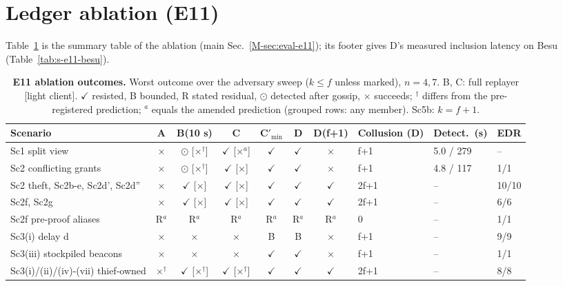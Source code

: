 \documentclass[10pt]{article}
\newcommand{\mainref}[1]{\ref{M-#1}}
\begin{document}
\section{Ledger ablation (E11)}
\label{sec:e11}
Table~\ref{tab:ablation} is the summary table of the ablation (main Sec.~\mainref{sec:eval-e11}); its footer gives D's
measured inclusion latency on Besu (Table~\ref{tab:s-e11-besu}).
\begin{table}[!htbp]
\centering
\caption{\textbf{E11 ablation outcomes.} Worst outcome over the adversary sweep ($k \le f$ unless marked), $n = 4, 7$. B, C: full replayer [light client]. $\checkmark$ resisted, B bounded, R stated residual, $\odot$ detected after gossip, $\times$ succeeds; $^{\dagger}$ differs from the pre-registered prediction; $^{a}$ equals the amended prediction (grouped rows: any member). Sc5b: $k = f+1$.}
\label{tab:ablation}
\tabsmall
\setlength{\tabcolsep}{3.6pt}
\begin{tabular}{@{}lcccccclll@{}}
\toprule
Scenario & A & B(10 s) & C & C$'_{\min}$ & D & D(f+1) & Collusion (D) & Detect.\ (s) & EDR \\
\midrule
Sc1 split view & $\times$ & $\odot$ [$\times$$^{\dagger}$] & $\checkmark$ [$\times$$^{a}$] & $\checkmark$ & $\checkmark$ & $\times$ & f+1 & 5.0 / 279 & -- \\
Sc2 conflicting grants & $\times$ & $\odot$ [$\times$$^{\dagger}$] & $\checkmark$ [$\times$] & $\checkmark$ & $\checkmark$ & $\times$ & f+1 & 4.8 / 117 & 1/1 \\
Sc2 theft, Sc2b-e, Sc2d', Sc2d'' & $\times$ & $\checkmark$ [$\times$] & $\checkmark$ [$\times$] & $\checkmark$ & $\checkmark$ & $\checkmark$ & 2f+1 & -- & 10/10 \\
Sc2f, Sc2g & $\times$ & $\checkmark$ [$\times$] & $\checkmark$ [$\times$] & $\checkmark$ & $\checkmark$ & $\checkmark$ & 2f+1 & -- & 6/6 \\
Sc2f pre-proof aliases & R$^{a}$ & R$^{a}$ & R$^{a}$ & R$^{a}$ & R$^{a}$ & R$^{a}$ & 0 & -- & 1/1 \\
Sc3(i) delay d & $\times$ & $\times$ & $\times$ & B & B & $\times$ & f+1 & -- & 9/9 \\
Sc3(iii) stockpiled beacons & $\times$ & $\times$ & $\times$ & $\checkmark$ & $\checkmark$ & $\times$ & f+1 & -- & 1/1 \\
Sc3(i)/(ii)/(iv)-(vii) thief-owned & $\times$$^{\dagger}$ & $\checkmark$ [$\times$$^{\dagger}$] & $\checkmark$ [$\times$$^{\dagger}$] & $\checkmark$ & $\checkmark$ & $\checkmark$ & 2f+1 & -- & 8/8 \\

\end{tabular}
\end{table}
\end{document}
